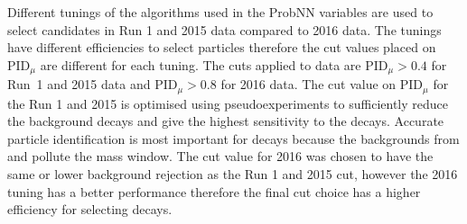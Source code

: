 Different tunings of the algorithms used in the ProbNN variables are used to select candidates in Run 1 and 2015 data compared to 2016 data. The tunings have different efficiencies to select particles therefore the cut values placed on PID$_{\mu}$ are different for each tuning. The cuts applied to data are $\text{PID}_{\mu} > 0.4$ for Run~1 and 2015 data and $\text{PID}_{\mu} > 0.8$ for 2016 data. 
The cut value on PID$_{\mu}$ for the Run 1 and 2015 is optimised using pseudoexperiments to sufficiently reduce the background decays and give the highest sensitivity to the \bdmumu decays. Accurate particle identification is most important for \bdmumu decays because the backgrounds from \bhh and \lambdab pollute the \bd mass window. The cut value for 2016 was chosen to have the same or lower background rejection as the Run 1 and 2015 cut, however the 2016 tuning has a better performance therefore the final cut choice has a higher efficiency for selecting \bmumu decays. 





